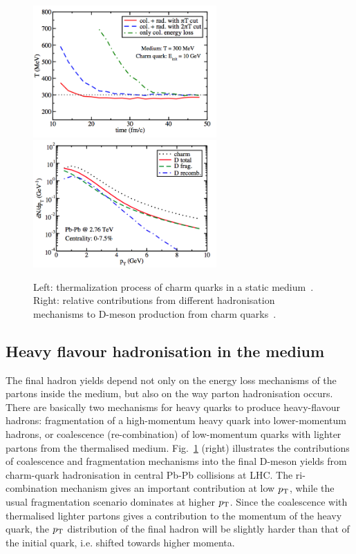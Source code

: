 \begin{figure}[!ht]
  \centering
  \includegraphics[width=7cm]{FigCap2/HFEnLoss3.png}
  \includegraphics[width=7cm]{FigCap2/FragHQ.png}
  \caption{Left: thermalization process of charm quarks in a static medium~\cite{Cao:2013ita}. Right: relative contributions from different hadronisation mechanisms to D-meson production from charm quarks~\cite{Cao:2013ita}.}
  \label{fig:HFEnLoss2}
\end{figure}

\subsection{Heavy flavour hadronisation in the medium}

The final hadron yields depend not only on the energy loss 
mechanisms of the partons inside the medium,
but also on the way parton hadronisation occurs. There are basically 
two mechanisms for heavy quarks 
to produce heavy-flavour hadrons: fragmentation of a high-momentum 
heavy quark into lower-momentum
hadrons, or coalescence (re-combination) of low-momentum 
quarks with lighter partons from the thermalised
medium. Fig.~\ref{fig:HFEnLoss2} (right) illustrates the 
contributions of coalescence and fragmentation 
mechanisms into the final D-meson yields from charm-quark 
hadronisation in central Pb-Pb collisions at LHC. The ri-combination mechanism
gives an important contribution at low $p_{\rm T}$, while the usual 
fragmentation scenario dominates at higher $p_{\rm T}$.
Since the coalescence with thermalised lighter partons gives 
a contribution to the momentum of the 
heavy quark, the $p_{\rm T}$ distribution of the final hadron will be slightly 
harder than that of the initial quark,
i.e. shifted towards higher momenta.\\



